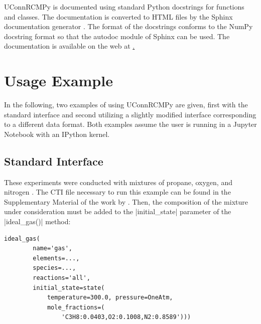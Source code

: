 \documentclass[12pt]{../ussci}
\begin{document}
UConnRCMPy is documented using standard Python docstrings for functions
and classes. The documentation is converted to HTML files by the Sphinx
documentation generator \autocite{Brandl2016}. The format of the
docstrings conforms to the NumPy docstring format so that the autodoc
module of Sphinx can be used. The documentation is available on the web
at \href{https://bryanwweber.github.io/UConnRCMPy/}.

\section{Usage Example}\label{usage-example}

In the following, two examples of using UConnRCMPy are given, first with
the standard interface and second utilizing a slightly modified
interface corresponding to a different data format. Both examples assume
the user is running in a Jupyter Notebook with an IPython kernel.

\subsection{Standard Interface}\label{standard-interface}

These experiments were conducted with mixtures of propane, oxygen, and
nitrogen \autocite{Dames2016}. The CTI file necessary to run this
example can be found in the Supplementary Material of the work by
\textcite{Dames2016}. Then, the composition of the mixture under consideration
must be added to the \python|initial_state| parameter of the
\python|ideal_gas()| method:

\begin{verbatim}
ideal_gas(
        name='gas',
        elements=...,
        species=...,
        reactions='all',
        initial_state=state(
            temperature=300.0, pressure=OneAtm,
            mole_fractions=(
                'C3H8:0.0403,O2:0.1008,N2:0.8589')))
\end{verbatim}
\end{document}
